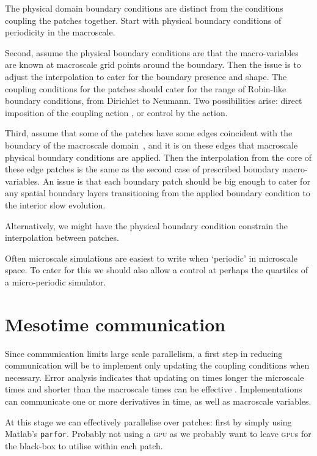 The physical domain boundary conditions are distinct from the conditions coupling the patches together.
Start with physical boundary conditions of periodicity in the macroscale.

Second, assume the physical boundary conditions are that the macro-variables are known at macroscale grid points around the boundary.  
Then the issue is to adjust the interpolation to cater for the boundary presence and shape.
The coupling conditions for the patches should cater for the range of Robin-like boundary conditions, from Dirichlet to Neumann.
Two possibilities arise: direct imposition of the coupling action \citep{Roberts06d}, or control by the action.

Third, assume that some of the patches have some edges coincident with the boundary of the macroscale domain~\XX, and it is on these edges that macroscale physical boundary conditions are applied.
Then the interpolation from the core of these edge patches is the same as the second case of prescribed boundary macro-variables.
An issue is that each boundary patch should be big enough to cater for any spatial boundary layers transitioning from the applied boundary condition to the interior slow evolution.

Alternatively, we might have the physical boundary condition constrain the interpolation between patches.

Often microscale simulations are easiest to write when `periodic' in microscale space.  
To cater for this we should also allow a control at perhaps the quartiles of a micro-periodic simulator.





\section{Mesotime communication}

Since communication limits large scale parallelism, a first step in reducing communication will be to implement only updating the coupling conditions when necessary.
Error analysis indicates that updating on times longer the microscale times and shorter than the macroscale times can be effective
\citep{Bunder2015a}.
Implementations can communicate one or more derivatives in time, as well as macroscale variables.

At this stage we can effectively parallelise over patches: first by simply using Matlab's \texttt{parfor}.   
Probably not using a \textsc{gpu} as we probably want to leave \textsc{gpu}s for the black-box to utilise within each patch.




